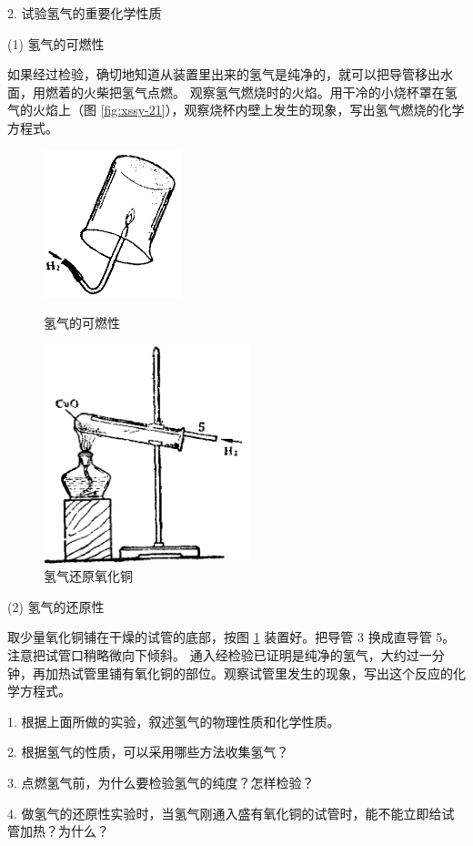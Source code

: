 \begin{shiyanbuzhou}
    2. 试验氢气的重要化学性质

    (1) 氢气的可燃性

    如果经过检验，确切地知道从装置里出来的氢气是纯净的，就可以把导管移出水面，用燃着的火柴把氢气点燃。
    观察氢气燃烧时的火焰。用干冷的小烧杯罩在氢气的火焰上（图 \ref{fig:xssy-21}），观察烧杯内壁上发生的现象，写出氢气燃烧的化学方程式。

    \begin{figure}[htbp]
        \centering
        \begin{minipage}[b]{7cm}
            \centering
            \includegraphics[width=4cm]{../pic/czhx1-xssy-21}
            \caption{氢气的可燃性}\label{fig:xssy-21}
        \end{minipage}
        \qquad
        \begin{minipage}[b]{7cm}
            \centering
            \includegraphics[width=6cm]{../pic/czhx1-xssy-22}
            \caption{氢气还原氧化铜}\label{fig:xssy-22}
        \end{minipage}
    \end{figure}

    (2) 氢气的还原性

    取少量氧化铜铺在干燥的试管的底部，按图 \ref{fig:xssy-22} 装置好。把导管 3 换成直导管 5。注意把试管口稍略微向下倾斜。
    通入经检验已证明是纯净的氢气，大约过一分钟，再加热试管里铺有氧化铜的部位。观察试管里发生的现象，写出这个反应的化学方程式。
\end{shiyanbuzhou}


\begin{wentihetaolun}
    1. 根据上面所做的实验，叙述氢气的物理性质和化学性质。

    2. 根据氢气的性质，可以采用哪些方法收集氢气？

    3. 点燃氢气前，为什么要检验氢气的纯度？怎样检验？

    4. 做氢气的还原性实验时，当氢气刚通入盛有氧化铜的试管时，能不能立即给试管加热？为什么？
\end{wentihetaolun}

